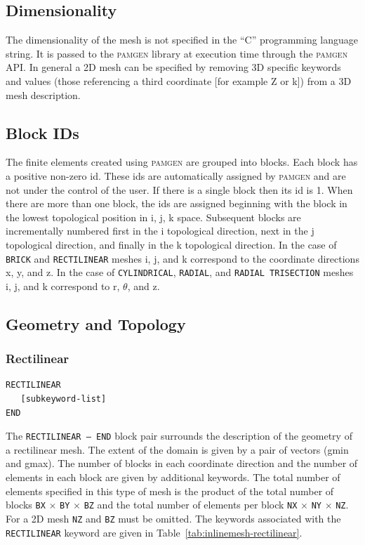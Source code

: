 \subsection{Dimensionality}
\label{sec:dimensionality}
The dimensionality of the mesh is not specified in the ``C'' programming language string. It is passed to the \textsc{pamgen} library at execution time through the \textsc{pamgen} API.  In general a 2D mesh can be specified by removing 3D specific keywords and values (those referencing a third coordinate [for example Z or k]) from a 3D mesh description. 

\subsection{Block IDs}
\label{sec:blockids}
The finite elements created using \textsc{pamgen} are grouped into blocks. Each block has a positive non-zero id.  These ids are automatically assigned by \textsc{pamgen} and are not under the control of the user. If there is a single block then its id is 1. When there are more than  one block, the ids are assigned beginning with the block in the lowest topological position in i, j, k space. Subsequent blocks are incrementally numbered first in the i topological direction, next in the j topological direction, and finally in the k topological direction. In the case of \texttt{BRICK} and \texttt{RECTILINEAR} meshes i, j, and k correspond to the coordinate directions x, y, and z. In the case of \texttt{CYLINDRICAL}, \texttt{RADIAL}, and \texttt{RADIAL TRISECTION} meshes i, j, and k correspond to r, $\theta$, and z.


\clearpage
\subsection{Geometry and Topology}
\label{sec:inline-mesh}

\subsubsection {Rectilinear}
{\ttfamily \begin{verbatim}
RECTILINEAR
   [subkeyword-list]
END
\end{verbatim}
}

The \texttt{RECTILINEAR -- END} block pair surrounds the description
of the geometry of a rectilinear mesh.  The extent
of the domain is given by a pair of vectors (gmin and gmax).  The
number of blocks in each coordinate direction and the number of
elements in each block are given by additional keywords.  The total
number of elements specified in this type of mesh is the
product of the total number of blocks \texttt{BX} $\times$ \texttt{BY}
$\times$ \texttt{BZ} and the total number of elements per block
\texttt{NX} $\times$ \texttt{NY} $\times$ \texttt{NZ}.  For a 2D mesh
\texttt{NZ} and \texttt{BZ} must be omitted.  The keywords associated
with the \texttt{RECTILINEAR} keyword are given in
Table~\ref{tab:inlinemesh-rectilinear}.


